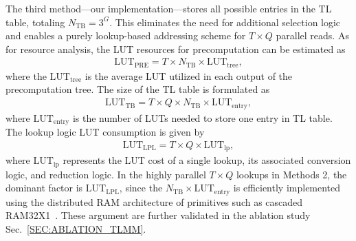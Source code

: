 \documentclass[sigconf]{acmart}
\begin{document}
The third method—our implementation—stores all possible entries in the TL table, totaling \( N_{\text{TB}} = 3^G \). This eliminates the need for additional selection logic and enables a purely lookup-based addressing scheme for \( T \times Q \) parallel reads.
As for resource analysis, the LUT resources for precomputation can be estimated as  
\begin{align}
\text{LUT}_{\text{PRE}} = T \times N_{\text{TB}} \times \text{LUT}_{\text{tree}},
\end{align}
where the $\text{LUT}_{\text{tree}}$ is the average LUT utilized in each output of the precomputation tree.
The size of the TL table is formulated as  
\begin{align}
\text{LUT}_{\text{TB}} = T \times Q \times N_{\text{TB}} \times \text{LUT}_{\text{entry}},  
\end{align}
where \( \text{LUT}_{\text{entry}} \) is the number of LUTs needed to store one entry in TL table. The lookup logic LUT consumption is given by  
\begin{align}
\text{LUT}_{\text{LPL}} = T \times Q \times \text{LUT}_{\text{lp}},
\end{align} 
where \( \text{LUT}_{\text{lp}} \) represents the LUT cost of a single lookup, its associated conversion logic, and reduction logic.
In the highly parallel \( T \times Q \) lookups in Methods 2, the dominant factor is \( \text{LUT}_{\text{LPL}} \), since the $N_{\text{TB}} \times \text{LUT}_{\text{entry}}$ is efficiently implemented using the distributed RAM architecture of primitives such as cascaded RAM32X1~\cite{AMD_UG974_ultrascale}. These argument are further validated in the ablation study  Sec.~\ref{SEC:ABLATION_TLMM}.

\end{document}
